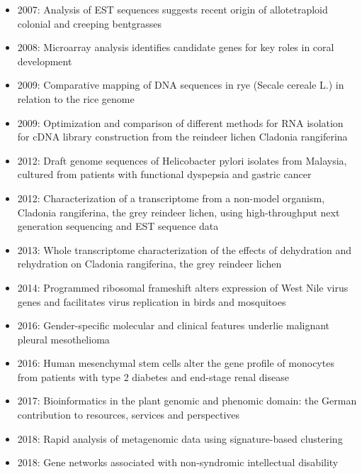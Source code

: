 \begin{itemize}
\item 2007: Analysis of EST sequences suggests recent origin of allotetraploid colonial and creeping bentgrasses
\item 2008: Microarray analysis identifies candidate genes for key roles in coral development
\item 2009: Comparative mapping of DNA sequences in rye (Secale cereale L.) in relation to the rice genome
\item 2009: Optimization and comparison of different methods for RNA isolation for cDNA library construction from the reindeer lichen Cladonia rangiferina
\item 2012: Draft genome sequences of Helicobacter pylori isolates from Malaysia, cultured from patients with functional dyspepsia and gastric cancer
\item 2012: Characterization of a transcriptome from a non-model organism, Cladonia rangiferina, the grey reindeer lichen, using high-throughput next generation sequencing and EST sequence data
\item 2013: Whole transcriptome characterization of the effects of dehydration and rehydration on Cladonia rangiferina, the grey reindeer lichen
\item 2014: Programmed ribosomal frameshift alters expression of West Nile virus genes and facilitates virus replication in birds and mosquitoes
\item 2016: Gender-specific molecular and clinical features underlie malignant pleural mesothelioma
\item 2016: Human mesenchymal stem cells alter the gene profile of monocytes from patients with type 2 diabetes and end-stage renal disease
\item 2017: Bioinformatics in the plant genomic and phenomic domain: the German contribution to resources, services and perspectives
\item 2018: Rapid analysis of metagenomic data using signature-based clustering
\item 2018: Gene networks associated with non-syndromic intellectual disability
\end{itemize}
